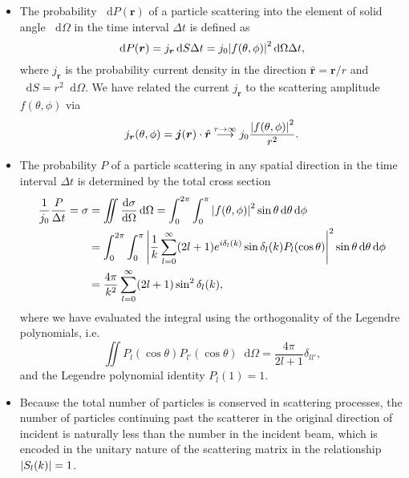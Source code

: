 \documentclass[11pt, a4paper]{article}
\newcommand{\diff}{\mathop{}\!\mathrm{d}} %
\renewcommand{\vec}[1]{\bm{#1}}  %
\newcommand{\uvec}[1]{\hat{\vec{#1}}}  %
\renewcommand{\r}{\vec{r}}  %
\begin{document}
\begin{itemize}

    \item The probability $ \diff P(\r) $ of a particle scattering into the element of solid angle $ \diff \Omega $ in the time interval $ \Delta t $ is defined as
    \begin{equation*}
        \diff P(\r) = j_{\r} \diff S \Delta t = j_{0} \abs{f(\theta, \phi)}^{2} \diff \Omega \Delta t,
    \end{equation*}
    where $ j_{\r} $ is the probability current density in the direction $ \uvec{r} = \r /r $ and $ \diff S = r^{2} \diff \Omega $. We have related the current $ j_{\r} $ to the scattering amplitude $ f(\theta, \phi) $ via
    \begin{equation*}
        j_{\r}(\theta, \phi) = \vec{j}(\r) \cdot \uvec{r} \stackrel{r \to \infty}{\longrightarrow} j_{0} \frac{\abs{f(\theta, \phi)}^{2}}{r^{2}}.
    \end{equation*}

    
    \item The probability $ P $ of a particle scattering in any spatial direction in the time interval $ \Delta t $ is determined by the total cross section
    \begin{align*}
        \frac{1}{j_{0}}\frac{P}{\Delta t} = \sigma &= \iint \frac{\diff \sigma}{\diff \Omega} \diff \Omega = \int_{0}^{2\pi}\int_{0}^{\pi} \abs{f(\theta, \phi)}^{2} \sin \theta \diff \theta \diff \phi \\
        & = \int_{0}^{2\pi}\int_{0}^{\pi} \abs{\frac{1}{k} \sum_{l = 0}^{\infty} (2l + 1)e^{i\delta_{l}(k)} \sin \delta_{l}(k) P_{l}(\cos \theta)}^{2} \sin \theta \diff \theta \diff \phi \\
        & = \frac{4\pi}{k^{2}} \sum_{l = 0}^{\infty} (2l + 1) \sin^{2}\delta_{l}(k),
    \end{align*}
    where we have evaluated the integral using the orthogonality of the Legendre polynomials, i.e.
    \begin{equation*}
        \iint P_{l}(\cos \theta) P_{l'}(\cos \theta) \diff \Omega = \frac{4 \pi}{2l + 1}\delta_{ll'},
    \end{equation*}
    and the Legendre polynomial identity $ P_{l}(1) = 1 $.

    \item Because the total number of particles is conserved in scattering processes, the number of particles continuing past the scatterer in the original direction of incident is naturally less than the number in the incident beam, which is encoded in the unitary nature of the scattering matrix in the relationship $ \abs{S_{l}(k)} = 1 $. 


\end{itemize}
\end{document}
